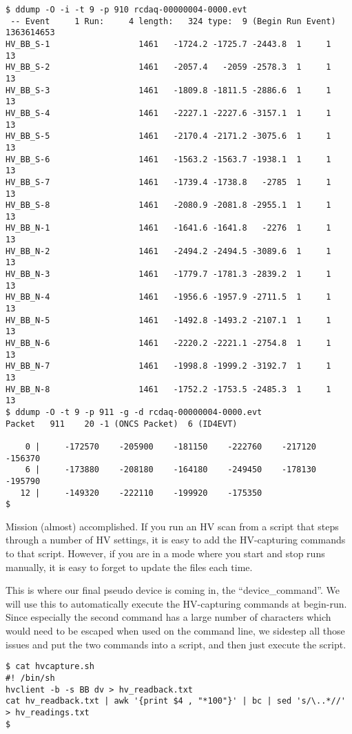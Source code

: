 \documentclass{article}[11pt]
\begin{document}
\begin{verbatim}
$ ddump -O -i -t 9 -p 910 rcdaq-00000004-0000.evt
 -- Event     1 Run:     4 length:   324 type:  9 (Begin Run Event)  1363614653
HV_BB_S-1                  1461   -1724.2 -1725.7 -2443.8  1     1    13
HV_BB_S-2                  1461   -2057.4   -2059 -2578.3  1     1    13
HV_BB_S-3                  1461   -1809.8 -1811.5 -2886.6  1     1    13
HV_BB_S-4                  1461   -2227.1 -2227.6 -3157.1  1     1    13
HV_BB_S-5                  1461   -2170.4 -2171.2 -3075.6  1     1    13
HV_BB_S-6                  1461   -1563.2 -1563.7 -1938.1  1     1    13
HV_BB_S-7                  1461   -1739.4 -1738.8   -2785  1     1    13
HV_BB_S-8                  1461   -2080.9 -2081.8 -2955.1  1     1    13
HV_BB_N-1                  1461   -1641.6 -1641.8   -2276  1     1    13
HV_BB_N-2                  1461   -2494.2 -2494.5 -3089.6  1     1    13
HV_BB_N-3                  1461   -1779.7 -1781.3 -2839.2  1     1    13
HV_BB_N-4                  1461   -1956.6 -1957.9 -2711.5  1     1    13
HV_BB_N-5                  1461   -1492.8 -1493.2 -2107.1  1     1    13
HV_BB_N-6                  1461   -2220.2 -2221.1 -2754.8  1     1    13
HV_BB_N-7                  1461   -1998.8 -1999.2 -3192.7  1     1    13
HV_BB_N-8                  1461   -1752.2 -1753.5 -2485.3  1     1    13
$ ddump -O -t 9 -p 911 -g -d rcdaq-00000004-0000.evt
Packet   911    20 -1 (ONCS Packet)  6 (ID4EVT)

    0 |     -172570    -205900    -181150    -222760    -217120    -156370 
    6 |     -173880    -208180    -164180    -249450    -178130    -195790 
   12 |     -149320    -222110    -199920    -175350 
$ 
\end{verbatim}

Mission (almost) accomplished. If you run an HV scan from a script
that steps through a number of HV settings, it is easy to add the
HV-capturing commands to that script.  However, if you are in a mode
where you start and stop runs manually, it is easy to forget to update
the files each time.

This is where our final pseudo device is coming in, the
``device\_command''. We will use this to automatically execute the
HV-capturing commands at begin-run. Since especially the second
command has a large number of characters which would need to be
escaped when used on the command line, we sidestep all those issues
and put the two commands into a script, and then just execute the
script.

\begin{verbatim}
$ cat hvcapture.sh
#! /bin/sh
hvclient -b -s BB dv > hv_readback.txt
cat hv_readback.txt | awk '{print $4 , "*100"}' | bc | sed 's/\..*//' > hv_readings.txt
$ 
\end{verbatim}
\end{document}
